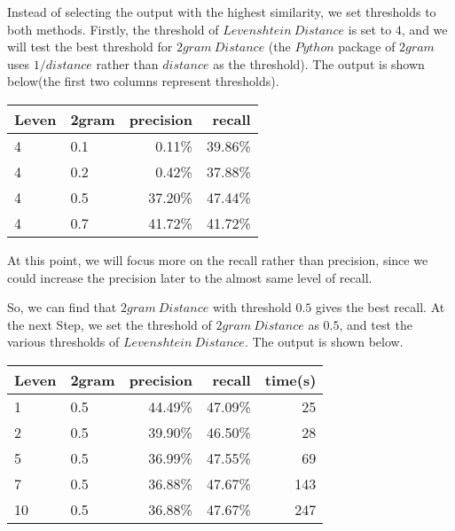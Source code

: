 \documentclass[11pt]{article}
\begin{document}
Instead of selecting the output with the highest similarity,
we set thresholds to both methods.
Firstly, the threshold of $Levenshtein \ Distance$ is set to $4$, and we will test
the best threshold for $2gram \ Distance$
(the $Python$ package of $2gram$ uses $1/distance$ rather than $distance$ as the threshold).
The output is shown below(the first two columns represent thresholds).
\begin{center}
    \begin{tabular}{|l|l|r|r|}
      \hline
      Leven & 2gram & precision & recall\\
      \hline
      4 & 0.1 & 0.11\% & 39.86\%\\
      \hline
      4 & 0.2 & 0.42\% & 37.88\%\\
      \hline
      4 & 0.5 & 37.20\% & 47.44\%\\
      \hline
      4 & 0.7 & 41.72\% & 41.72\%\\
      \hline
    \end{tabular}
\end{center}

At this point, we will focus more on the recall rather than precision,
since we could increase the precision later
to the almost same level of recall.

So, we can find that $2gram \ Distance$ with threshold $0.5$
gives the best recall.
At the next Step, we set the threshold of $2gram \ Distance$ as $0.5$,
and test the various thresholds of $Levenshtein \ Distance$.
The output is shown below.
\begin{center}
    \begin{tabular}{|l|l|r|r|r|}
      \hline
      Leven & 2gram & precision & recall & time(s)\\
      \hline
      1 & 0.5 & 44.49\% & 47.09\% & 25\\
      \hline
      2 & 0.5 & 39.90\% & 46.50\% & 28\\
      \hline
      5 & 0.5 & 36.99\% & 47.55\% & 69\\
      \hline
      7 & 0.5 & 36.88\% & 47.67\% & 143\\
      \hline
      10 & 0.5 & 36.88\% & 47.67\% & 247\\
      \hline
    \end{tabular}
\end{center}
\end{document}
